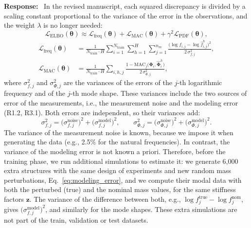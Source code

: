 \documentclass[11pt]{article}
\newenvironment{response}{\par\smallskip\noindent\color{resp}\textbf{Response:}\ }{\par}
\newcommand{\z}{\mathbf{z}}
\begin{document}
\begin{response}
In the revised manuscript, each squared discrepancy is divided by a scaling constant proportional to the variance of the error in the observations, and the weight $\lambda$ is no longer needed:
\begin{equation}
\mathcal{L}_{\text{ELBO}}(\bm\theta)\approx\mathcal{L}_{\text{freq}}(\bm\theta)+\mathcal{L}_{\text{MAC}}(\bm\theta)
+\gamma^2\mathcal{L}_{\text{PDF}}(\bm\theta),
\label{eq:loss}
\end{equation}
\begin{equation}
\begin{aligned}
\mathcal{L}_{\text{freq}}(\bm\theta)&=\frac{1}{N_{\text{train}}\cdot H}\sum_{i=1}^{N_{\text{train}}}\sum_{h=1}^{H}
\sum_{j=1}^{n_m}\frac{\big(\log f_{i,j}-\log\hat f_{i,j}^{h}\big)^2}{2\,\sigma_{f,j}^2},\\
\mathcal{L}_{\text{MAC}}(\bm\theta)&=\frac{1}{N_{\text{train}}\cdot H}\sum_{i,h,j}
\frac{1-\mathrm{MAC}_j\big(\bm\Phi_i,\hat{\bm\Phi}_i^{h}\big)}{2\,\sigma_{\Phi,j}^2},
\end{aligned}
\label{eq:nll}
\end{equation}
where $\sigma_{f,j}^2$ and $\sigma_{\Phi,j}^2$ are the variances of the errors of the $j$-th logarithmic frequency and of the $j$-th mode shape.
These variances include the two sources of error of the measurements, i.e., the measurement noise and the modeling error (R1.2, R3.1).
Both errors are independent, so their variances add:
\begin{equation}
\sigma_{f,j}^2=\big(\sigma_{f,j}^{\text{noise}}\big)^2+\big(\sigma_{f,j}^{\text{model}}\big)^2,\qquad
\sigma_{\Phi,j}^2=\big(\sigma_{\Phi,j}^{\text{noise}}\big)^2+\big(\sigma_{\Phi,j}^{\text{model}}\big)^2.
\label{eq:var_sum}
\end{equation}
The variance of the measurement noise is known, because we impose it when generating the data (e.g., 2.5\% for the natural frequencies).
In contrast, the variance of the modeling error is not known a priori.
Therefore, before the training phase, we run additional simulations to estimate it: we generate 6,000 extra structures with the same design of experiments and new random mass perturbations, Eq.~\eqref{eq:modeling_error}, and we compute their modal data with both the perturbed (true) and the nominal mass values, for the same stiffness factors $\z$.
The variance of the difference between both, e.g., $\log f_j^{\text{true}}-\log f_j^{\text{nom}}$, gives $\big(\sigma_{f,j}^{\text{model}}\big)^2$, and similarly for the mode shapes.
These extra simulations are not part of the train, validation or test datasets.

\end{response}
\end{document}
